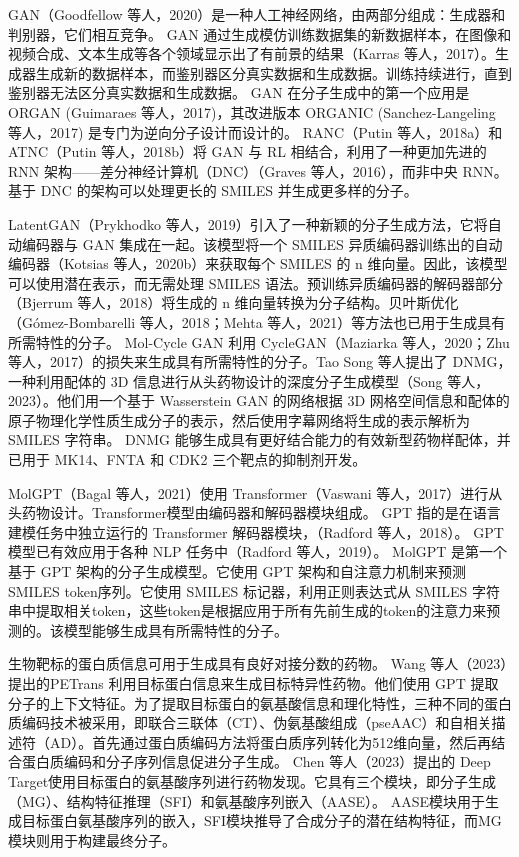 \begin{translation}
GAN（Goodfellow 等人，2020）是一种人工神经网络，由两部分组成：生成器和判别器，它们相互竞争。 GAN 通过生成模仿训练数据集的新数据样本，在图像和视频合成、文本生成等各个领域显示出了有前景的结果（Karras 等人，2017）。生成器生成新的数据样本，而鉴别器区分真实数据和生成数据。训练持续进行，直到鉴别器无法区分真实数据和生成数据。 GAN 在分子生成中的第一个应用是 ORGAN (Guimaraes 等人，2017)，其改进版本 ORGANIC (Sanchez-Langeling 等人，2017) 是专门为逆向分子设计而设计的。 RANC（Putin 等人，2018a）和 ATNC（Putin 等人，2018b）将 GAN 与 RL 相结合，利用了一种更加先进的 RNN 架构——差分神经计算机（DNC）（Graves 等人，2016），而非中央 RNN。基于 DNC 的架构可以处理更长的 SMILES 并生成更多样的分子。

LatentGAN（Prykhodko 等人，2019）引入了一种新颖的分子生成方法，它将自动编码器与 GAN 集成在一起。该模型将一个 SMILES 异质编码器训练出的自动编码器（Kotsias 等人，2020b）来获取每个 SMILES 的 n 维向量。因此，该模型可以使用潜在表示，而无需处理 SMILES 语法。预训练异质编码器的解码器部分（Bjerrum 等人，2018）将生成的 n 维向量转换为分子结构。贝叶斯优化（Gómez-Bombarelli 等人，2018；Mehta 等人，2021）等方法也已用于生成具有所需特性的分子。 Mol-Cycle GAN 利用 CycleGAN（Maziarka 等人，2020；Zhu 等人，2017）的损失来生成具有所需特性的分子。Tao Song 等人提出了 DNMG，一种利用配体的 3D 信息进行从头药物设计的深度分子生成模型（Song 等人，2023）。他们用一个基于 Wasserstein GAN 的网络根据 3D 网格空间信息和配体的原子物理化学性质生成分子的表示，然后使用字幕网络将生成的表示解析为 SMILES 字符串。 DNMG 能够生成具有更好结合能力的有效新型药物样配体，并已用于 MK14、FNTA 和 CDK2 三个靶点的抑制剂开发。

MolGPT（Bagal 等人，2021）使用 Transformer（Vaswani 等人，2017）进行从头药物设计。Transformer模型由编码器和解码器模块组成。 GPT 指的是在语言建模任务中独立运行的 Transformer 解码器模块，（Radford 等人，2018）。 GPT 模型已有效应用于各种 NLP 任务中（Radford 等人，2019）。 MolGPT 是第一个基于 GPT 架构的分子生成模型。它使用 GPT 架构和自注意力机制来预测 SMILES token序列。它使用 SMILES 标记器，利用正则表达式从 SMILES 字符串中提取相关token，这些token是根据应用于所有先前生成的token的注意力来预测的。该模型能够生成具有所需特性的分子。

生物靶标的蛋白质信息可用于生成具有良好对接分数的药物。 Wang 等人（2023）提出的PETrans 利用目标蛋白信息来生成目标特异性药物。他们使用 GPT 提取分子的上下文特征。为了提取目标蛋白的氨基酸信息和理化特性，三种不同的蛋白质编码技术被采用，即联合三联体（CT）、伪氨基酸组成（pseAAC）和自相关描述符（AD）。首先通过蛋白质编码方法将蛋白质序列转化为512维向量，然后再结合蛋白质编码和分子序列信息促进分子生成。 Chen 等人（2023）提出的 Deep Target使用目标蛋白的氨基酸序列进行药物发现。它具有三个模块，即分子生成（MG）、结构特征推理（SFI）和氨基酸序列嵌入（AASE）。 AASE模块用于生成目标蛋白氨基酸序列的嵌入，SFI模块推导了合成分子的潜在结构特征，而MG模块则用于构建最终分子。


\end{translation}
